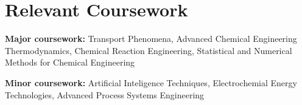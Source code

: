 \documentclass[letterpaper,11pt]{article}
\newcommand{\resumeSubHeadingListStart}{\begin{itemize}[leftmargin=0.15in, label={}]}
\newcommand{\resumeSubHeadingListEnd}{\end{itemize}}
\begin{document}

\section{Relevant Coursework}
\vspace{2pt}
\resumeSubHeadingListStart
  \small{\item{
      \textbf{Major coursework:}{ Transport Phenomena, Advanced Chemical Engineering Thermodynamics, Chemical Reaction Engineering, Statistical and Numerical Methods for Chemical Engineering} \\ \vspace{3pt}
      
      \textbf{Minor coursework:}{ Artificial Inteligence Techniques, Electrochemial Energy Technologies, Advanced Process Systems Engineering}
  }}
\resumeSubHeadingListEnd













\end{document}
